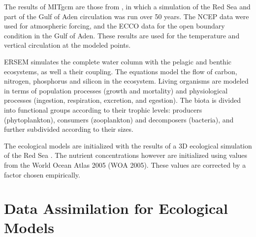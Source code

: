 The results of MITgcm are those from \citet{Yao2014, Yao2014b}, in which a
simulation of the Red Sea and part of the Gulf of Aden circulation was run over
50 years. The NCEP data were used for atmospheric forcing, and the ECCO data
for the open boundary condition in the Gulf of Aden. These results are used for
the temperature and vertical circulation at the modeled points.

ERSEM simulates the complete water column with the pelagic and benthic
ecosystems, as well a their coupling. The equations model the flow of carbon,
nitrogen, phosphorus and silicon in the ecosystem. Living organisms are modeled
in terms of population processes (growth and mortality) and physiological
processes (ingestion, respiration, excretion, and egestion). The biota is
divided into functional groups according to their trophic levels: producers
(phytoplankton), consumers (zooplankton) and decomposers (bacteria), and
further subdivided according to their sizes.

The ecological models are initialized with the results of a 3D ecological
simulation of the Red Sea \citep{Triantafyllou2014}. The nutrient
concentrations however are initialized using values from the World Ocean Atlas
2005 (WOA 2005). These values are corrected by a factor chosen empirically.

\section{Data Assimilation for Ecological Models}

